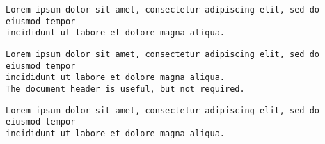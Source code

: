 \begin{verbatim}
Lorem ipsum dolor sit amet, consectetur adipiscing elit, sed do eiusmod tempor
incididunt ut labore et dolore magna aliqua.
\end{verbatim}

\begin{verbatim}
Lorem ipsum dolor sit amet, consectetur adipiscing elit, sed do eiusmod tempor
incididunt ut labore et dolore magna aliqua.
The document header is useful, but not required.
\end{verbatim}

\begin{verbatim}
Lorem ipsum dolor sit amet, consectetur adipiscing elit, sed do eiusmod tempor
incididunt ut labore et dolore magna aliqua.
\end{verbatim}
